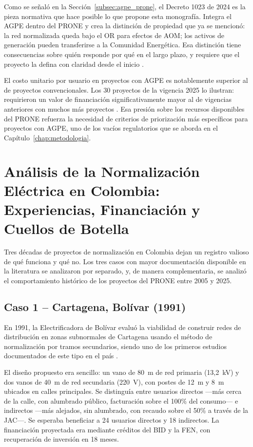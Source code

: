 Como se señaló en la Sección~\ref{subsec:agpe_prone}, el Decreto 1023 de 2024 es la pieza normativa que hace posible lo que propone esta monografía. Integra el AGPE dentro del PRONE y crea la distinción de propiedad que ya se mencionó: la red normalizada queda bajo el OR para efectos de AOM; los activos de generación pueden transferirse a la Comunidad Energética. Esa distinción tiene consecuencias sobre quién responde por qué en el largo plazo, y requiere que el proyecto la defina con claridad desde el inicio \parencite{Decreto1023_2024}.

El costo unitario por usuario en proyectos con AGPE es notablemente superior al de proyectos convencionales. Los 30 proyectos de la vigencia 2025 lo ilustran: requirieron un valor de financiación significativamente mayor al de vigencias anteriores con muchos más proyectos \parencite{MME2025}. Esa presión sobre los recursos disponibles del PRONE refuerza la necesidad de criterios de priorización más específicos para proyectos con AGPE, uno de los vacíos regulatorios que se aborda en el Capítulo~\ref{chap:metodologia}.


\section{Análisis de la Normalización Eléctrica en Colombia: Experiencias, Financiación y Cuellos de Botella}
\label{sec:casos_estudio}

Tres décadas de proyectos de normalización en Colombia dejan un registro valioso de qué funciona y qué no. Los tres casos con mayor documentación disponible en la literatura se analizaron por separado, y, de manera complementaria, se analizó el comportamiento histórico de los proyectos del PRONE entre 2005 y 2025.

\subsection{Caso 1 -- Cartagena, Bolívar (1991)}
\label{subsec:caso_cartagena}

En 1991, la Electrificadora de Bolívar evaluó la viabilidad de construir redes de distribución en zonas subnormales de Cartagena usando el método de normalización por tramos secundarios, siendo uno de los primeros estudios documentados de este tipo en el país \parencite{CastilloQuintana1991}.

El diseño propuesto era sencillo: un vano de 80~m de red primaria (13,2~kV) y dos vanos de 40~m de red secundaria (220~V), con postes de 12~m y 8~m ubicados en calles principales. Se distinguía entre usuarios directos —más cerca de la calle, con alumbrado público, facturación sobre el 100\% del consumo— e indirectos —más alejados, sin alumbrado, con recaudo sobre el 50\% a través de la JAC—. Se esperaba beneficiar a 24 usuarios directos y 18 indirectos. La financiación proyectada era mediante créditos del BID y la FEN, con recuperación de inversión en 18 meses.

